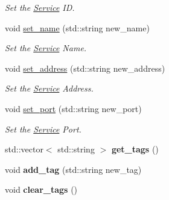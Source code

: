 \begin{DoxyCompactItemize}
\begin{DoxyCompactList}\small\item\em Set the \hyperlink{classService}{Service} I\-D. \end{DoxyCompactList}\item 
\hypertarget{classService_a8131d07e27a83148512ab82d70948dfc}{void \hyperlink{classService_a8131d07e27a83148512ab82d70948dfc}{set\-\_\-name} (std\-::string new\-\_\-name)}\label{classService_a8131d07e27a83148512ab82d70948dfc}

\begin{DoxyCompactList}\small\item\em Set the \hyperlink{classService}{Service} Name. \end{DoxyCompactList}\item 
\hypertarget{classService_a5f7aecf124823ad22e0c5265eb895cdc}{void \hyperlink{classService_a5f7aecf124823ad22e0c5265eb895cdc}{set\-\_\-address} (std\-::string new\-\_\-address)}\label{classService_a5f7aecf124823ad22e0c5265eb895cdc}

\begin{DoxyCompactList}\small\item\em Set the \hyperlink{classService}{Service} Address. \end{DoxyCompactList}\item 
\hypertarget{classService_a7bacad58f3bfb9f8d0bd757c89c0e4c4}{void \hyperlink{classService_a7bacad58f3bfb9f8d0bd757c89c0e4c4}{set\-\_\-port} (std\-::string new\-\_\-port)}\label{classService_a7bacad58f3bfb9f8d0bd757c89c0e4c4}

\begin{DoxyCompactList}\small\item\em Set the \hyperlink{classService}{Service} Port. \end{DoxyCompactList}\item 
\hypertarget{classService_ab3decdaff5d89934fe6b190c5bd74d57}{std\-::vector$<$ std\-::string $>$ {\bfseries get\-\_\-tags} ()}\label{classService_ab3decdaff5d89934fe6b190c5bd74d57}

\item 
\hypertarget{classService_ac700081515b84a002e4f9953c931727a}{void {\bfseries add\-\_\-tag} (std\-::string new\-\_\-tag)}\label{classService_ac700081515b84a002e4f9953c931727a}

\item 
\hypertarget{classService_a0bb490a55ed7bb2d82a760f980539bb0}{void {\bfseries clear\-\_\-tags} ()}\label{classService_a0bb490a55ed7bb2d82a760f980539bb0}


\end{DoxyCompactItemize}
